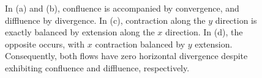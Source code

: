 \documentclass[10pt,twocolumn]{memoir}
\begin{document}
\begin{figure}[h]
\caption{In (a) and (b), confluence is accompanied by convergence, and diffluence by divergence. In (c), contraction along the $y$ direction is exactly balanced by extension along the $x$ direction. In (d), the opposite occurs, with $x$ contraction balanced by $y$ extension. Consequently, both flows have zero horizontal divergence despite exhibiting confluence and diffluence, respectively.}
\label{fig:c1_confluence_diffluence}
\end{figure}
\end{document}
